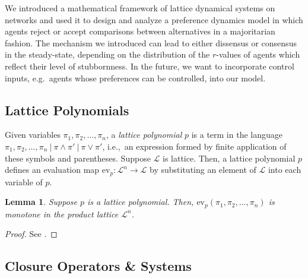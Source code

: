 \documentclass[conference]{ieeeconf}
\newcommand{\lattice}{\mathcal{L}}
\newcommand{\join}{\vee}
\newcommand{\meet}{\wedge}
\newtheorem{lemma}{Lemma}
\begin{document}
We introduced a mathematical framework of lattice dynamical systems on networks and used it to design and analyze a preference dynamics model in which agents reject or accept comparisons between alternatives in a majoritarian fashion. The mechanism we introduced can lead to either dissensus or consensus in the steady-state, depending on the distribution of the $r$-values of agents which reflect their level of stubbornness. In the future, we want to incorporate control inputs, e.g.~agents whose preferences can be controlled, into our model.





\appendix

\vspace{-0.25em}
\subsection{Lattice Polynomials}
\vspace{-0.25em}

Given variables $\pi_1,\pi_2,\dots,\pi_n$, a \emph{lattice polynomial} $p$ is a term in the language $\pi_1,\pi_2,\dots,\pi_n~\vert~\pi \meet \pi'~\vert~\pi \join \pi'$, i.e.,~an expression formed by finite application of these symbols and parentheses. Suppose $\lattice$ is  lattice. Then, a lattice polynomial $p$ defines an evaluation map $\mathrm{ev}_p: \lattice^n \to \lattice$ by substituting an element of $\lattice$ into each variable of $p$.

\begin{lemma} \label{lem:lattice-polynomial}
    Suppose $p$ is a lattice polynomial. Then, $\mathrm{ev}_p(\pi_1,\pi_2,\dots,\pi_n)$ is monotone in the product lattice $\lattice^n$.
\end{lemma}
\begin{proof}
    See \cite[\S II.5 Lemma 4]{birkhoff1940}.
\end{proof}

\vspace{-0.25em}
\subsection{Closure Operators \& Systems}
\vspace{-0.25em}
\end{document}
